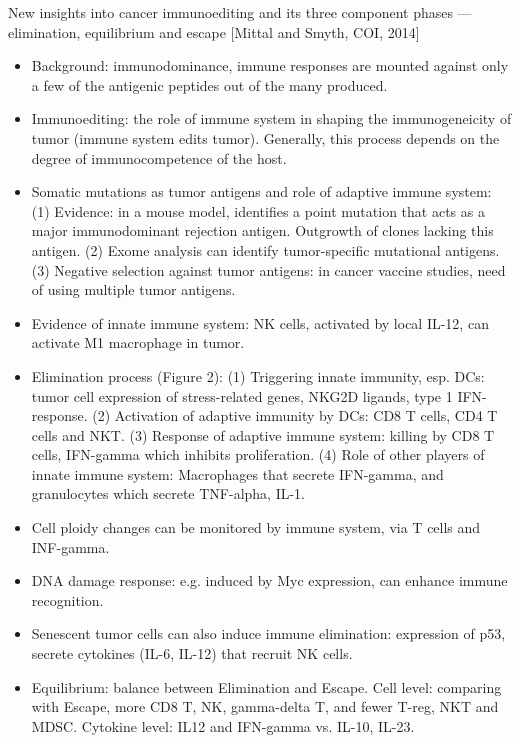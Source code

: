 \documentclass{report}
\begin{document}
New insights into cancer immunoediting and its three component phases — elimination, equilibrium and escape [Mittal and Smyth, COI, 2014]
\begin{itemize}
	\item Background: immunodominance, immune responses are mounted against only a few of the antigenic peptides out of the many produced. 
	
	\item Immunoediting: the role of immune system in shaping the immunogeneicity of tumor (immune system edits tumor). Generally, this process depends on the degree of immunocompetence of the host. 
	
	\item Somatic mutations as tumor antigens and role of adaptive immune system: (1) Evidence: in a mouse model, identifies a point mutation that acts as a major immunodominant rejection antigen. Outgrowth of clones lacking this antigen. (2) Exome analysis can identify tumor-specific mutational antigens. (3) Negative selection against tumor antigens: in cancer vaccine studies, need of using multiple tumor antigens. 
	
	\item Evidence of innate immune system: NK cells, activated by local IL-12, can activate M1 macrophage in tumor. 
	
	\item Elimination process (Figure 2): (1) Triggering innate immunity, esp. DCs: tumor cell expression of stress-related genes, NKG2D ligands, type 1 IFN- response. (2) Activation of adaptive immunity by DCs: CD8 T cells, CD4 T cells and NKT. (3) Response of adaptive immune system: killing by CD8 T cells, IFN-gamma which inhibits proliferation. (4) Role of other players of innate immune system: Macrophages that secrete IFN-gamma, and granulocytes which secrete TNF-alpha, IL-1. 
	
	\item Cell ploidy changes can be monitored by immune system, via T cells and INF-gamma. 
	
	\item DNA damage response: e.g. induced by Myc expression, can enhance immune recognition. 
	
	\item Senescent tumor cells can also induce immune elimination: expression of p53, secrete cytokines (IL-6, IL-12) that recruit NK cells. 
	
	\item Equilibrium: balance between Elimination and Escape. Cell level: comparing with Escape, more CD8 T, NK, gamma-delta T, and fewer T-reg, NKT and MDSC. Cytokine level: IL12 and IFN-gamma vs. IL-10, IL-23. 
	

\end{itemize}
\end{document}
